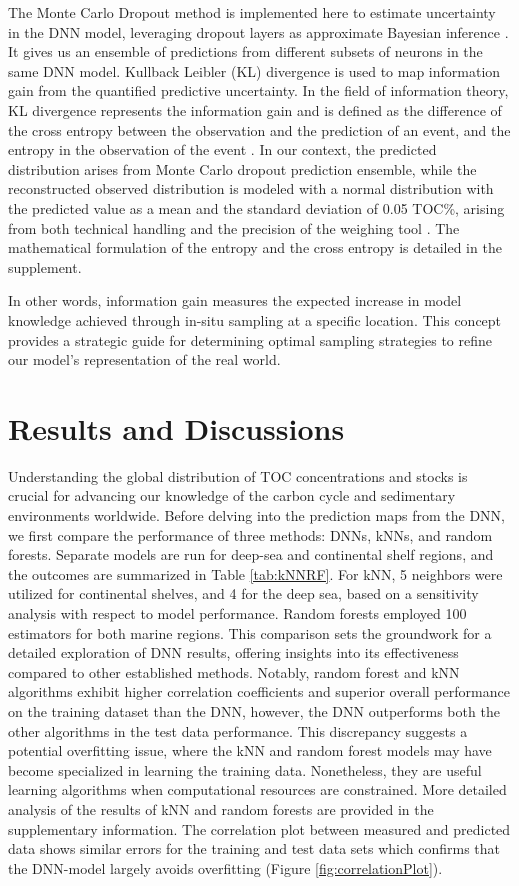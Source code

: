 \documentclass[journal abbreviation, manuscript]{copernicus}
\begin{document}
The Monte Carlo Dropout method is implemented here to estimate uncertainty in the DNN model, leveraging dropout layers as approximate Bayesian inference \citep{MCDropout}. It gives us an ensemble of predictions from different subsets of neurons in the same DNN model. Kullback Leibler (KL) divergence is used to map information gain from the quantified predictive uncertainty. In the field of information theory, KL divergence represents the information gain and is defined as the difference of the cross entropy between the observation and the prediction of an event, and the entropy in the observation of the event \citep{kullbackleibler1951}. In our context, the predicted distribution arises from Monte Carlo dropout prediction ensemble, while the reconstructed observed distribution is modeled with a normal distribution with the predicted value as a mean and the standard deviation of 0.05 TOC\%, arising from both technical handling and the precision of the weighing tool \citep{pape2020}. The mathematical formulation of the entropy and the cross entropy is detailed in the supplement.

In other words, information gain measures the expected increase in model knowledge achieved through in-situ sampling at a specific location. This concept provides a strategic guide for determining optimal sampling strategies to refine our model's representation of the real world.

%


\section{Results and Discussions}
Understanding the global distribution of TOC concentrations and stocks is crucial for advancing our knowledge of the carbon cycle and sedimentary environments worldwide. Before delving into the prediction maps from the DNN, we first compare the performance of three methods: DNNs, kNNs, and random forests. Separate models are run for deep-sea and continental shelf regions, and the outcomes are summarized in Table \ref{tab:kNNRF}. For kNN, 5 neighbors were utilized for continental shelves, and 4 for the deep sea, based on a sensitivity analysis with respect to model performance. Random forests employed 100 estimators for both marine regions. This comparison sets the groundwork for a detailed exploration of DNN results, offering insights into its effectiveness compared to other established methods. Notably, random forest and kNN algorithms exhibit higher correlation coefficients and superior overall performance on the training dataset than the DNN, however, the DNN outperforms both the other algorithms in the test data performance. This discrepancy suggests a potential overfitting issue, where the kNN and random forest models may have become specialized in learning the training data. Nonetheless, they are useful learning algorithms when computational resources are constrained. More detailed analysis of the results of kNN and random forests are provided in the supplementary information. The correlation plot between measured and predicted data shows similar errors for the training and test data sets which confirms that the DNN-model largely avoids overfitting (Figure \ref{fig:correlationPlot}).
\end{document}
